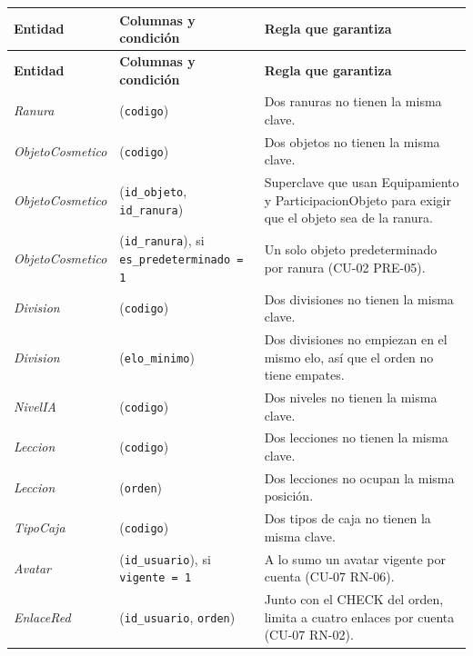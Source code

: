 \begin{center}\small
\begin{longtable}{|L{0.2\textwidth}|L{0.25\textwidth}|L{0.45\textwidth}|}
\hline
\textbf{Entidad} & \textbf{Columnas y condición} & \textbf{Regla que garantiza} \\ \hline
\endfirsthead
\hline
\textbf{Entidad} & \textbf{Columnas y condición} & \textbf{Regla que garantiza} \\ \hline
\endhead
\textit{Ranura} & (\texttt{codigo}) & Dos ranuras no tienen la misma clave. \\ \hline
\textit{Objeto\-Cosmetico} & (\texttt{codigo}) & Dos objetos no tienen la misma clave. \\ \hline
\textit{Objeto\-Cosmetico} & (\texttt{id\_\allowbreak{}objeto}, \texttt{id\_\allowbreak{}ranura}) & Superclave que usan Equipamiento y ParticipacionObjeto para exigir que el objeto sea de la ranura. \\ \hline
\textit{Objeto\-Cosmetico} & (\texttt{id\_\allowbreak{}ranura}), si \texttt{es\_\allowbreak{}predeterminado = 1} & Un solo objeto predeterminado por ranura (\mbox{CU-02} \mbox{PRE-05}). \\ \hline
\textit{Division} & (\texttt{codigo}) & Dos divisiones no tienen la misma clave. \\ \hline
\textit{Division} & (\texttt{elo\_\allowbreak{}minimo}) & Dos divisiones no empiezan en el mismo elo, así que el orden no tiene empates. \\ \hline
\textit{Nivel\-IA} & (\texttt{codigo}) & Dos niveles no tienen la misma clave. \\ \hline
\textit{Leccion} & (\texttt{codigo}) & Dos lecciones no tienen la misma clave. \\ \hline
\textit{Leccion} & (\texttt{orden}) & Dos lecciones no ocupan la misma posición. \\ \hline
\textit{Tipo\-Caja} & (\texttt{codigo}) & Dos tipos de caja no tienen la misma clave. \\ \hline
\textit{Avatar} & (\texttt{id\_\allowbreak{}usuario}), si \texttt{vigente = 1} & A lo sumo un avatar vigente por cuenta (\mbox{CU-07} \mbox{RN-06}). \\ \hline
\textit{Enlace\-Red} & (\texttt{id\_\allowbreak{}usuario}, \texttt{orden}) & Junto con el CHECK del orden, limita a cuatro enlaces por cuenta (\mbox{CU-07} \mbox{RN-02}). \\ \hline

\end{longtable}
\end{center}
